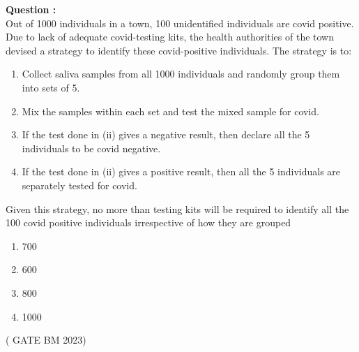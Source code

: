 \documentclass[journal,12pt,onecolumn]{IEEEtran}
\renewcommand{\thefigure}{\theenumi}
\renewcommand{\thetable}{\theenumi}
\begin{document}

\bigskip

\renewcommand{\thefigure}{\arabic{figure}}
\renewcommand{\thetable}{\theenumi}

%

\textbf{Question :}\\
Out of 1000 individuals in a town, 100 unidentified individuals are covid positive.
Due to lack of adequate covid-testing kits, the health authorities of the town devised
a strategy to identify these covid-positive individuals. The strategy is to:
\begin{enumerate}
\item Collect saliva samples from all 1000 individuals and randomly group
them into sets of 5.
\item Mix the samples within each set and test the mixed sample for covid.
\item If the test done in (ii) gives a negative result, then declare all the 5
individuals to be covid negative.
\item If the test done in (ii) gives a positive result, then all the 5 individuals
are separately tested for covid.
\end{enumerate}
Given this strategy, no more than testing kits will be required to identify
all the 100 covid positive individuals irrespective of how they are grouped \\ 
\begin{enumerate}
\item 700
\item 600
\item 800
\item 1000
\end{enumerate}\hfill ( GATE BM 2023)
\end{document}
